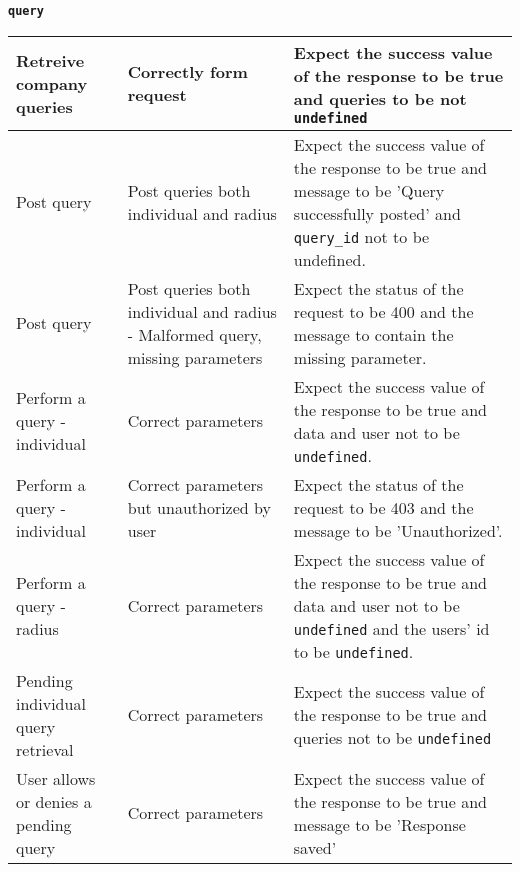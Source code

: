 \noindent\textbf{\texttt{query}}
\begin{longtable}{|p{}|p{}|p{}|}
Retreive company queries & Correctly form request & Expect the success value of the response to be true and queries to be not \texttt{undefined} \\
\hline
Post query & Post queries both individual and radius & Expect the success value of the response to be true and message to be 'Query successfully posted' and \texttt{query\_id} not to be undefined. \\
\hline
Post query & Post queries both individual and radius - Malformed query, missing parameters & Expect the status of the request to be 400 and the message to contain the missing parameter. \\
\hline

Perform a query - individual & Correct parameters &  Expect the success value of the response to be true and data and user not to be \texttt{undefined}. \\
\hline
Perform a query - individual & Correct parameters but unauthorized by user &   Expect the status of the request to be 403 and the message to be 'Unauthorized'. \\
\hline
Perform a query - radius & Correct parameters &  Expect the success value of the response to be true and data and user not to be \texttt{undefined} and the users' id to be \texttt{undefined}. \\
\hline
Pending individual query retrieval & Correct parameters &  Expect the success value of the response to be true and queries not to be \texttt{undefined} \\
\hline

User allows or denies a pending query & Correct parameters &  Expect the success value of the response to be true and message to be 'Response saved'\\
\hline


\end{longtable}

